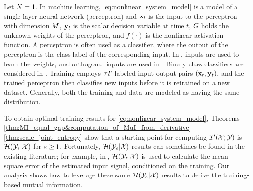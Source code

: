 \documentclass[12pt, draftclsnofoot,journal,onecolumn]{IEEEtran}
\begin{document}

Let $N=1$.  In machine learning, \eqref{eq:nonlinear_system_model} is a model of a single layer neural network (perceptron) \cite{opper1996statistical,engel2001statistical,shinzato2008learning} and ${\mathbf{x}}_t$ is the input to the perceptron with dimension $M$, ${\mathbf{y}}_t$ is the scalar decision variable at time $t$, $G$ holds the unknown weights of the perceptron, and $f(\cdot)$ is the nonlinear activation function. A perceptron is often used as a classifier, where the output of the perceptron is the class label of the corresponding input. In \cite{opper1996statistical,engel2001statistical}, \iid inputs are used to learn the weights, and orthogonal inputs are used in \cite{shinzato2008learning}. Binary class classifiers are considered in \cite{opper1996statistical,engel2001statistical,shinzato2008learning}.
Training employs ${\tau T}$ labeled input-output pairs $({\mathbf{x}}_t,{\mathbf{y}}_t)$, and the trained perceptron then classifies new inputs before it is retrained on a new dataset.  Generally, both the training and data are modeled as having the same distribution.

To obtain optimal training results for \eqref{eq:nonlinear_system_model}, Theorems \ref{thm:MI_equal_gap&computation_of_MuI_from_derivative}--\ref{thm:scale_joint_entropy} show that a starting point for computing
$\mathcal{I}{'}({\mathcal{X}};{\mathcal{Y}}{})$ is $\mathcal{H}(\mathcal{Y}_\varepsilon|\mathcal{X})$ for $\varepsilon\geq 1$.  Fortunately, $\mathcal{H}(\mathcal{Y}_\varepsilon|\mathcal{X})$ results can sometimes be found in the existing literature; for example, in \cite{wen2015performance,wen2015joint,wen2016bayes}, $\mathcal{H}(\mathcal{Y}_\varepsilon|\mathcal{X})$ is used to calculate the mean-square error of the estimated input signal, conditioned on the training.  Our analysis shows how to leverage these same $\mathcal{H}(\mathcal{Y}_\varepsilon|\mathcal{X})$ results to derive the training-based mutual information.  
\end{document}
